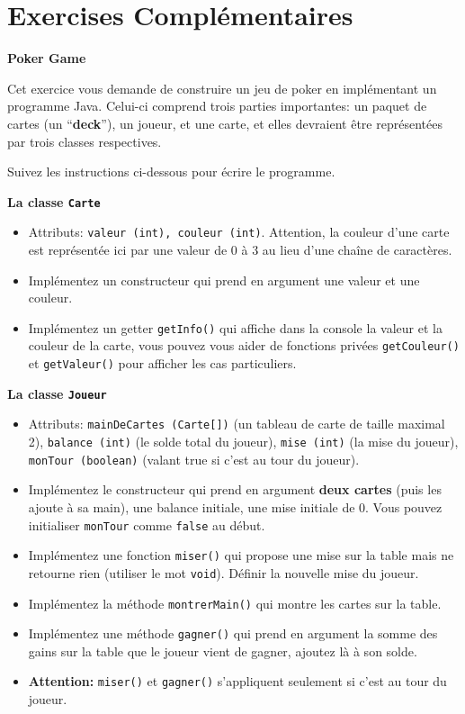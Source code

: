 \newpage

\section{Exercises Complémentaires}
\begin{Exercice}[15 minutes]\textbf{Poker Game}

Cet exercice vous demande de construire un jeu de poker en implémentant un programme Java. Celui-ci comprend trois parties importantes: un paquet de cartes (un ``\textbf{deck}''), un joueur, et une carte, et elles devraient être représentées par trois classes respectives.

Suivez les instructions ci-dessous pour écrire le programme.

\textbf{La classe \lstinline{Carte}}
\begin{itemize}
    \item Attributs: \lstinline{valeur (int), couleur (int)}. Attention, la couleur d'une carte est représentée ici par une valeur de 0 à 3 au lieu d'une chaîne de caractères.
    \item Implémentez un constructeur qui prend en argument une valeur et une couleur.
    \item Implémentez un getter \lstinline{getInfo()} qui affiche dans la console la valeur et la couleur de la carte, vous pouvez vous aider de fonctions privées
    \lstinline{getCouleur()} et \lstinline{getValeur()} pour afficher les cas particuliers.
\end{itemize}




\textbf{La classe \lstinline{Joueur}}
\begin{itemize}
    \item Attributs: \lstinline{mainDeCartes (Carte[])} (un tableau de carte de taille maximal 2), \lstinline{balance (int)} (le solde total du joueur), \lstinline{mise (int)} (la mise du joueur), \lstinline{monTour (boolean)} (valant true si c’est au tour du joueur).
    \item Implémentez le constructeur qui prend en argument \textbf{deux cartes} (puis les ajoute à sa main), une balance initiale, une mise initiale de 0. Vous pouvez initialiser \lstinline{monTour} comme \lstinline{false} au début.
    \item Implémentez une fonction \lstinline{miser()} qui propose une mise sur la table mais ne retourne rien (utiliser le mot \lstinline{void}). Définir la nouvelle mise du joueur.
    \item Implémentez la méthode \lstinline{montrerMain()} qui montre les cartes sur la table.
    \item Implémentez une méthode \lstinline{gagner()} qui prend en argument la somme des gains sur la table que le joueur vient de gagner, ajoutez là à son solde.
    \item \textbf{Attention:} \lstinline{miser()} et \lstinline{gagner()} s'appliquent seulement si c’est au tour du joueur.
\end{itemize}



\end{Exercice}
